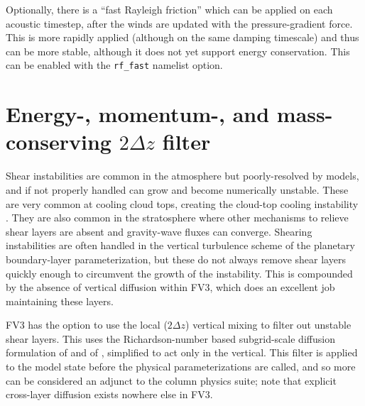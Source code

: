 \documentclass[10pt,letterpaper,margin=1in]{memoir}
\begin{document}
Optionally, there is a ``fast Rayleigh friction'' which can be applied on each acoustic timestep, after the winds are updated with the pressure-gradient force. This is more rapidly applied (although on the same damping timescale) and thus can be more stable, although it does not yet support energy conservation. This can be enabled with the \texttt{rf_fast} namelist option.


\section{Energy-, momentum-, and mass-conserving $2\Delta z$ filter} \label{sec:2dzfilter}

Shear instabilities are common in the atmosphere but poorly-resolved by models, and if not properly handled can grow and become numerically unstable. These are very common at cooling cloud tops, creating the cloud-top cooling instability \citep{Lilly1968}. They are  also common in the stratosphere where other mechanisms to relieve shear layers are absent and gravity-wave fluxes can converge. Shearing instabilities are often handled in the vertical turbulence scheme of the planetary boundary-layer parameterization, but these do not always remove shear layers quickly enough to circumvent the growth of the instability. This is compounded by the absence of vertical diffusion within FV3, which does an excellent job maintaining these layers. 

FV3 has the option to use the local ($2\Delta z$) vertical mixing to filter out unstable shear layers. This uses the Richardson-number based subgrid-scale diffusion formulation of \citet{Lilly1962} %
and of \citet{Smagorinsky1963}, simplified to act only in the vertical. This filter is applied to the model state before the physical parameterizations are called, and so more can be considered an adjunct to the column physics suite; note that explicit cross-layer diffusion exists nowhere else in FV3.
\end{document}
